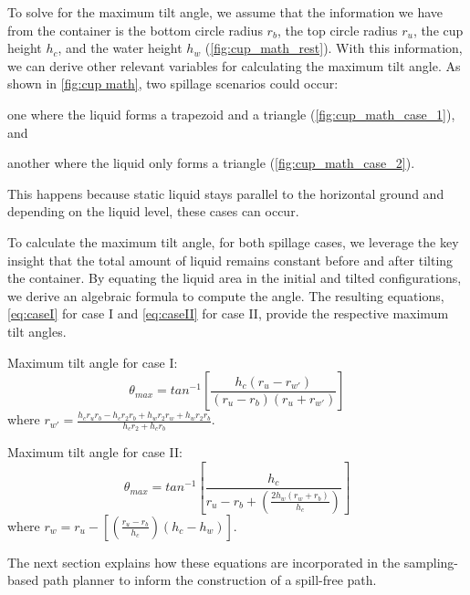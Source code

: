 To solve for the maximum tilt angle, we assume that the information we have from the container is the bottom circle radius $r_b$, the top circle radius $r_u$, the cup height $h_c$, and the water height $h_w$ (\cref{fig:cup_math_rest}). With this information, we can derive other relevant variables for calculating the maximum tilt angle. As shown in \cref{fig:cup math}, two spillage scenarios could occur: 
\begin{enumerate*}[label=(\roman*)]
\item one where the liquid forms a trapezoid and a triangle (\cref{fig:cup_math_case_1}), and
\item another where the liquid only forms a triangle (\cref{fig:cup_math_case_2}).
\end{enumerate*} This happens because static liquid stays parallel to the horizontal ground and depending on the liquid level, these cases can occur.

To calculate the maximum tilt angle, for both spillage cases, we leverage the key insight that the total amount of liquid remains constant before and after tilting the container. By equating the liquid area in the initial and tilted configurations, we derive an algebraic formula to compute the angle. The resulting equations, \cref{eq:caseI} for case I and \cref{eq:caseII} for case II, provide the respective maximum tilt angles.


Maximum tilt angle for case I:
\begin{equation}
\theta_{max} = tan^{-1} \left[\frac
{h_c(r_u-r_{w'})}
{(r_u-r_b)(r_u+r_{w'})}\right]
\label{eq:caseI}
\end{equation}
where $r_{w'}= \frac{h_cr_ur_b - h_cr_2r_b + h_wr_2r_w + h_wr_2r_b}{h_cr_2 + h_cr_b}$.

Maximum tilt angle for case II:
\begin{equation}
\theta_{max} =tan^{-1} \left[ \frac
{h_c}
{r_u-r_b+(\frac{2h_w(r_w+r_b)}{h_c})}\right]
\label{eq:caseII}
\end{equation}
where $r_{w}= r_u-[(\frac{r_u-r_b}{h_c})(h_c-h_w)]$.

The next section explains how these equations are incorporated in the sampling-based path planner to inform the construction of a spill-free path.


